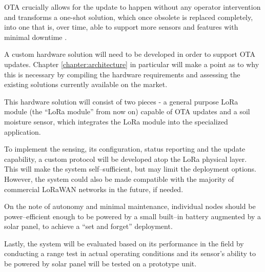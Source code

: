 OTA crucially allows for the update to happen without any operator intervention and transforms a one-shot solution, which once obsolete is replaced completely, into one that is, over time, able to support more sensors and features with minimal downtime \cite{mobility_connected_what_2024,noauthor_android_2024,bucklin_brown_over--air_2024}.

A custom hardware solution will need to be developed in order to support OTA updates. Chapter \ref{chapter:architecture} in particular will make a point as to why this is necessary by compiling the hardware requirements and assessing the existing solutions currently available on the market. 

This hardware solution will consist of two pieces - a general purpose LoRa module (the ``LoRa module'' from now on) capable of OTA updates and a soil moisture sensor, which integrates the LoRa module into the specialized application.

To implement the sensing, its configuration, status reporting and the update capability, a custom protocol will be developed atop the LoRa physical layer. This will make the system self--sufficient, but may limit the deployment options. However, the system could also be made compatible with the majority of commercial LoRaWAN networks in the future, if needed.

On the note of autonomy and minimal maintenance, individual nodes should be power--efficient enough to be powered by a small built--in battery augmented by a solar panel, to achieve a ``set and forget'' deployment. 

Lastly, the system will be evaluated based on its performance in the field by conducting a range test in actual operating conditions and its sensor's ability to be powered by solar panel will be tested on a prototype unit.
